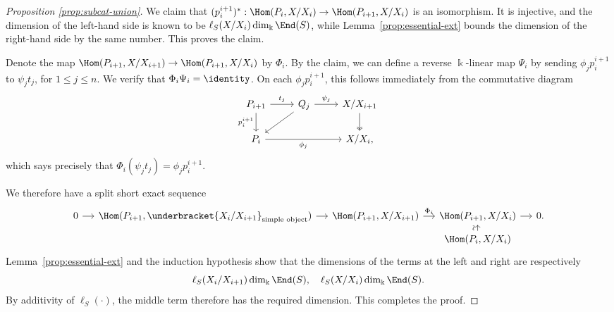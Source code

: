\begin{proof}[Proposition \ref{prop:subcat-union}]
	We claim that
	$(p^{i+1}_i)^*:\Hom(P_i,X/X_i)\to\Hom(P_{i+1},X/X_i)$
	is an isomorphism. It is injective, and the dimension of the left-hand side is known to be
	$\ell_S(X/X_i)\dim_{\Bbbk}\End(S)$, while Lemma~\ref{prop:essential-ext} bounds the dimension of the right-hand side by the same number. This proves the claim.

	Denote the map
	$\Hom(P_{i+1},X/X_{i+1})\to\Hom(P_{i+1},X/X_i)$ by $\Phi_i$. By the claim, we can define a reverse $\Bbbk$-linear map $\Psi_i$ by sending
	$\phi_jp^{i+1}_i$ to $\psi_jt_j$, for $1\leq j\leq n$. We verify that $\Phi_i\Psi_i=\identity$. On each $\phi_jp^{i+1}_i$, this follows immediately from the commutative diagram
	\[\begin{tikzcd}
		P_{i+1} \arrow[r, "{t_j}"] \arrow[d, "{p^{i+1}_i}"'] & Q_j \arrow[r, "{\psi_j}"] \arrow[ld] & X/X_{i+1} \arrow[twoheadrightarrow, d] \\
		P_i \arrow[rr, "{\phi_j}"'] & & X/X_i ,
	\end{tikzcd}\]
	which says precisely that $\Phi_i(\psi_jt_j)=\phi_jp^{i+1}_i$.

	We therefore have a split short exact sequence
	\[\begin{tikzcd}[row sep=tiny, column sep=small]
		0 \arrow[r] & \Hom(P_{i+1}, \underbracket{X_i/X_{i+1}}_{\text{simple object}}) \arrow[r] & \Hom(P_{i+1}, X/X_{i+1}) \arrow[r, "{\Phi_i}"] & \Hom(P_{i+1}, X/X_i) \arrow[r] & 0. \\
		& & & \Hom(P_i , X/X_i) \arrow[u, "\sim" sloped] &
	\end{tikzcd}\]
	Lemma~\ref{prop:essential-ext} and the induction hypothesis show that the dimensions of the terms at the left and right are respectively
	\[ \ell_S(X_i/X_{i+1}) \dim_{\Bbbk} \End(S), \quad \ell_S(X/X_i) \dim_{\Bbbk} \End(S). \]
	By additivity of $\ell_S(\cdot)$, the middle term therefore has the required dimension. This completes the proof.
\end{proof}


